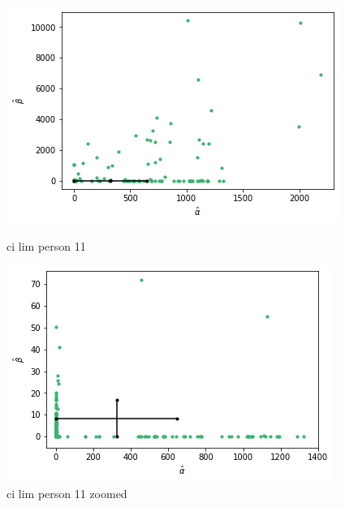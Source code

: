 \begin{figure}
    \centering
    \begin{minipage}{0.48\textwidth}
        \centering
        \includegraphics[scale=0.37]{pictures/ci_lim_a_b_person11.png}
        \caption{ci lim person 11}
        \label{fig:ci_lim_a_b_person_11}
    \end{minipage}\hfill
    \begin{minipage}{0.48\textwidth}
        \centering
        \includegraphics[scale=0.37]{pictures/ci_lim_a_b_person11_zoomed.png}
        \caption{ci lim person 11 zoomed}
        \label{fig:ci_lim_a_b_person_11_zoomed}
    \end{minipage}
\end{figure}

